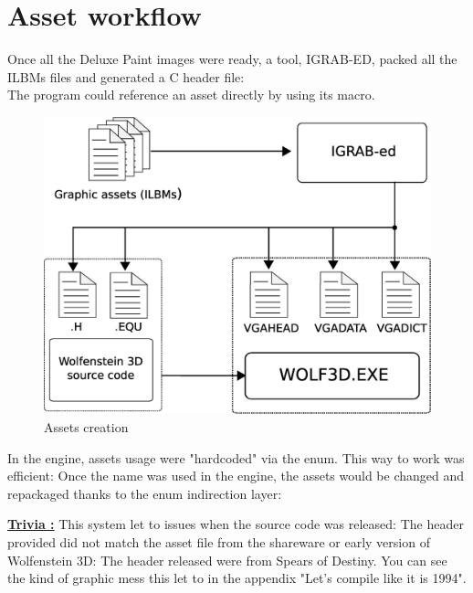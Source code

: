 \documentclass[book.tex]{subfiles}
\begin{document}
\section{Asset workflow}
Once all the Deluxe Paint images were ready, a tool, IGRAB-ED, packed all the ILBMs files and generated a C header file:\\
 The program could reference an asset directly by using its macro.\\
\begin{figure}[H]
\centering
 \includegraphics[width=\textwidth]{imgs/drawing_plain.eps}
 \caption{Assets creation} \label{fig:mips}
 \end{figure}

\begin{minipage}{\textwidth}
 \par
 \end{minipage}
 
 In the engine, assets usage were "hardcoded" via the enum. This way to work was efficient: Once the name was used in the engine, the assets would be changed and repackaged thanks to the enum indirection layer:\\
 \par
 \begin{minipage}{\textwidth}
 \par
 \end{minipage}

\textbf{\underline{Trivia :}} This system let to issues when the source code was released: The header provided did not match the asset file from the shareware or early version of Wolfenstein 3D: The header released were from Spears of Destiny. You can see the kind of graphic mess this let to in the appendix "Let's compile like it is 1994".\\
\end{document}

